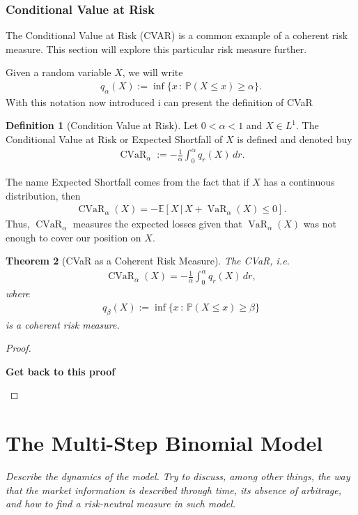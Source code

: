 \documentclass{article}
\newtheorem{theorem}{Theorem}[section]
\theoremstyle{definition}
\newtheorem{definition}[theorem]{Definition}
\numberwithin{equation}{section}
\DeclareMathOperator{\VaR}{VaR}
\DeclareMathOperator{\cvar}{CVaR}
\newcommand{\taskcolor}{RedOrange}
\newcommand{\task}[1]{
    \begin{center}
        \colorbox{\taskcolor}{
            \textsf{
                \textbf{#1}
            }
        }
    \end{center}
}
\begin{document}
\subsubsection{Conditional Value at Risk}
The Conditional Value at Risk (CVAR) is a common example of a coherent risk measure.
This section will explore this particular risk measure further.

Given a random variable $X$, we will write
\begin{align}
    q_\alpha(X) := \inf \{x \, : \, \mathbb{P}(X \leq x) \geq \alpha\}.
\end{align}
With this notation now introduced i can present the definition of CVaR
\begin{definition}[Condition Value at Risk]
    Let $ 0 < \alpha < 1$ and $X \in L^1$.
    The Conditional Value at Risk or Expected Shortfall of $X$ is defined and denoted buy
    \begin{align}
        \cvar_\alpha := - \frac{1}{\alpha}\int_0^\alpha q_r(X) \, dr.
    \end{align}
\end{definition}
The name Expected Shortfall comes from the fact that if $X$ has a continuous distribution, then
\begin{align}
    \cvar_\alpha(X) = - \mathbb{E}[X \, | \, X + \VaR_\alpha(X) \leq 0].
\end{align}
Thus, $\cvar_\alpha$ measures the expected losses given that $\VaR_\alpha(X)$ was not enough to cover our position on $X$.
\begin{theorem}[CVaR as a Coherent Risk Measure]
   The CVaR, i.e. 
   \begin{align}
        \cvar_\alpha(X) = - \frac{1}{\alpha}\int_0^\alpha q_r(X) \, dr,
   \end{align}
    where
   \begin{align}
       q_\beta(X) := \inf \{x \, : \, \mathbb{P}(X \leq x) \geq \beta\}
   \end{align}
   is a coherent risk measure.
\end{theorem}
\begin{proof}
    \task{Get back to this proof}
\end{proof}
\newpage

\section{The Multi-Step Binomial Model}
\textit{Describe the dynamics of the model. Try to discuss, among other things, the way that the market information is described through time, its absence of arbitrage, and how to find a risk-neutral measure in such model.}
\end{document}
